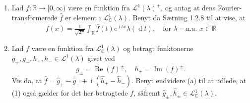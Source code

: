 \documentclass{Class}
\newcommand{\R}{\mathbb{R}}
\newcommand{\C}{\mathbb{C}}
\newcommand{\1}{\mathbbm{1}}
\newcommand{\lclass}{\mathcal{L}}
\newcommand{\deriv}{\operatorname{d}}
\newcommand{\icomp}{\operatorname{i}}
\theoremstyle{boxed}
\begin{document}
\begin{enumerate}
  \item Lad $f:\R\rightarrow [0,\infty)$ være en funktion fra $\lclass^1(\lambda)^+$, og antag at dens Fourier-transformerede $\hat{f}$ er element i $\lclass_\C^1(\lambda)$. Benyt da Sætning 1.2.8 til at vise, at 
  \begin{align}
    f(x)=\frac{1}{\sqrt{2\pi}}\int_\R\hat{f}(t)e^{\icomp tx}\lambda(\deriv t), \quad \text{for }\lambda-\text{n.a. }x\in\R
  \end{align}
  \item Lad $f$ være en funktion fra $\lclass_\C^1(\lambda)$ og betragt funktonerne $g_+, g_-,h_+,h_-\in\lclass^1(\lambda)$ givet ved $$g_\pm=\operatorname{Re}(f)^\pm, \quad h_\pm=\operatorname{Im}(f)^\pm.$$
  Vis da, at $\hat{f}=\hat{g}_+-\hat{g}_-+\icomp(\hat{h}_+-\hat{h}_-).$ Benyt endvidere (a) til at udlede, at (1) også gælder for det her betragtede $f$, såfremt $\hat{g}_\pm, \hat{h}_\pm\in\lclass_\C^1(\lambda).$
\end{enumerate}
\solution
\end{document}
